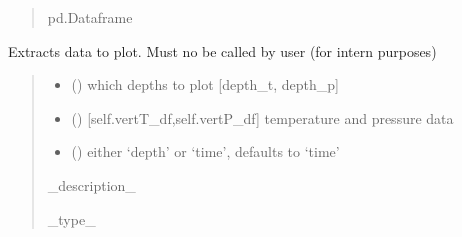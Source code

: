 \documentclass[letterpaper,10pt,english]{sphinxmanual}
\begin{document}
\begin{fulllineitems}
\begin{fulllineitems}
\begin{quote}
\begin{description}
\sphinxAtStartPar
pd.Dataframe

\end{description}\end{quote}

\end{fulllineitems}


\begin{fulllineitems}
\label{\detokenize{tscw_module:tscw_module.tscw_DataClassesOutput.TSCW_Output.create_data_array2plot}}
\pysigstartsignatures
{}
\pysigstopsignatures
\sphinxAtStartPar
Extracts data to plot. Must no be called by user (for intern purposes)
\begin{quote}\begin{description}
\begin{itemize}
\item {} 
\sphinxAtStartPar
{} () \textendash{} which depths to plot {[}depth\_t, depth\_p{]}

\item {} 
\sphinxAtStartPar
{} () \textendash{} {[}self.vertT\_df,self.vertP\_df{]} temperature and pressure data

\item {} 
\sphinxAtStartPar
{} (\sphinxstyleliteralemphasis{\sphinxupquote{, }}) \textendash{} either ‘depth’ or ‘time’, defaults to ‘time’

\end{itemize}

\sphinxAtStartPar
\_description\_

\sphinxAtStartPar
\_type\_


\end{description}
\end{quote}
\end{fulllineitems}
\end{fulllineitems}
\end{document}

